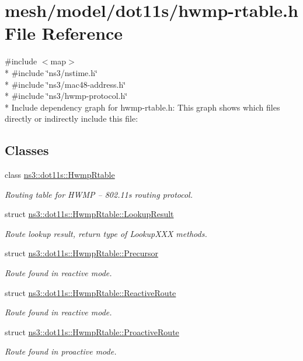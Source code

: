 \hypertarget{hwmp-rtable_8h}{}\section{mesh/model/dot11s/hwmp-\/rtable.h File Reference}
\label{hwmp-rtable_8h}
{\ttfamily \#include $<$map$>$}\\*
{\ttfamily \#include \char`\"{}ns3/nstime.\+h\char`\"{}}\\*
{\ttfamily \#include \char`\"{}ns3/mac48-\/address.\+h\char`\"{}}\\*
{\ttfamily \#include \char`\"{}ns3/hwmp-\/protocol.\+h\char`\"{}}\\*
Include dependency graph for hwmp-\/rtable.h\+:
This graph shows which files directly or indirectly include this file\+:
\subsection*{Classes}
\begin{DoxyCompactItemize}
\item 
class \hyperlink{classns3_1_1dot11s_1_1HwmpRtable}{ns3\+::dot11s\+::\+Hwmp\+Rtable}
\begin{DoxyCompactList}\small\item\em Routing table for H\+W\+MP -- 802.\+11s routing protocol. \end{DoxyCompactList}\item 
struct \hyperlink{structns3_1_1dot11s_1_1HwmpRtable_1_1LookupResult}{ns3\+::dot11s\+::\+Hwmp\+Rtable\+::\+Lookup\+Result}
\begin{DoxyCompactList}\small\item\em Route lookup result, return type of Lookup\+X\+XX methods. \end{DoxyCompactList}\item 
struct \hyperlink{structns3_1_1dot11s_1_1HwmpRtable_1_1Precursor}{ns3\+::dot11s\+::\+Hwmp\+Rtable\+::\+Precursor}
\begin{DoxyCompactList}\small\item\em Route found in reactive mode. \end{DoxyCompactList}\item 
struct \hyperlink{structns3_1_1dot11s_1_1HwmpRtable_1_1ReactiveRoute}{ns3\+::dot11s\+::\+Hwmp\+Rtable\+::\+Reactive\+Route}
\begin{DoxyCompactList}\small\item\em Route found in reactive mode. \end{DoxyCompactList}\item 
struct \hyperlink{structns3_1_1dot11s_1_1HwmpRtable_1_1ProactiveRoute}{ns3\+::dot11s\+::\+Hwmp\+Rtable\+::\+Proactive\+Route}
\begin{DoxyCompactList}\small\item\em Route found in proactive mode. \end{DoxyCompactList}\end{DoxyCompactItemize}

